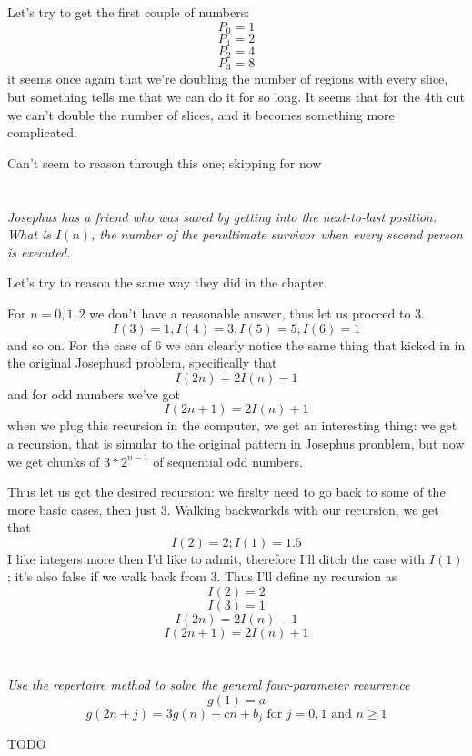\documentclass[11pt,oneside,titlepage]{book}
\begin{document}
Let's try to get the first couple of numbers:
$$P_0 = 1$$
$$P_1 = 2$$
$$P_2 = 4$$
$$P_3 = 8$$
it seems once again that we're doubling the number of regions with every slice, but something
tells me that we can do it for so long. It seems that for the 4th cut we can't double the number
of slices, and it becomes something more complicated.

Can't seem to reason through this one; skipping for now

\section{}

\textit{Josephus has a friend who was saved by getting into the next-to-last position. What
  is $I(n)$, the number of the penultimate survivor when every second person is executed.}

Let's try to reason the same way they did in the chapter.

For $n = 0, 1, 2$ we don't have a reasonable answer, thus let us procced to 3.
$$I(3) = 1; I(4) = 3; I(5) = 5; I(6) = 1$$
and  so on. For the case of 6 we can clearly notice  the same thing that kicked in in the
original Josephusd problem, specifically that
$$I(2n) = 2I(n) - 1$$
and for odd numbers we've got
$$I(2n + 1) = 2I(n) + 1$$
when we plug this recursion in the computer, we get an interesting thing: we get a recursion,
that is simular to the original pattern in Josephus pronblem, but now we get chunks
of $3 * 2^{n - 1}$ of sequential odd numbers.

Thus let us get the desired recursion: we firslty need to go back to some of the more basic cases,
then just 3. Walking backwarkds with our recursion, we get that
$$I(2) = 2; I(1) = 1.5$$
I like integers more then I'd like to admit, therefore I'll ditch the case with $I(1)$; it's
also false if we walk back from 3. Thus I'll define ny recursion as
$$I(2) = 2$$
$$I(3) = 1$$
$$I(2n) = 2I(n) - 1$$
$$I(2n + 1) = 2I(n) + 1$$

\section{}

\textit{Use the repertoire method to solve the general four-parameter recurrence}
$$g(1) = a$$
$$g(2n + j) = 3g(n) + cn + b_j \text{ for } j = 0, 1 \text{ and } n \geq 1$$

TODO
\end{document}
